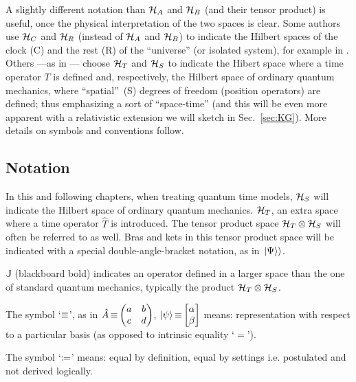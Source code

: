 A slightly different notation than $\mathcal{H}_A$ and $\mathcal{H}_B$ (and their tensor product)
is useful, once
the physical interpretation of the two spaces is clear.
Some authors use $\mathcal{H}_C$ and $\mathcal{H}_R$ (instead of $\mathcal{H}_A$ and $\mathcal{H}_B$)
to indicate the Hilbert spaces of the clock (C) and the rest (R) of the ``universe''
(or isolated system), for example in \cite{Marletto:Evolution}.
Others ---as in \cite{Lloyd:Time}--- 
choose $\mathcal{H}_T$ and $\mathcal{H}_S$ to indicate the Hibert space where
a time operator $T$ is defined and, respectively,
the Hilbert space of ordinary quantum mechanics,
where ``spatial''~(S)
degrees of freedom (position operators) are defined; thus emphasizing
a sort of ``space-time'' (and this will be even more apparent
with a relativistic extension we will sketch in Sec.~\ref{sec:KG}).
More details on symbols and conventions follow.

\subsection*{Notation}

In this and following chapters, when treating quantum time models,
$\mathcal{H}_S$ will indicate the Hilbert space of ordinary quantum mechanics.
$\mathcal{H}_T$, an extra space where a time operator $\hat{T}$ is introduced. The tensor
product space $\mathcal{H}_T \otimes \mathcal{H}_S$
will often be referred to as well.
Bras and kets in this tensor product space will be indicated with a special double-angle-bracket
notation, as in $\left.\left| \Psi \right\rangle\right\rangle$.

${\mathbb{J}}$ (blackboard bold) indicates an  operator defined in
a larger space than the one of standard quantum mechanics,
typically the product $\mathcal{H}_T \otimes \mathcal{H}_S$.

The symbol `$\operatorname*{\equiv}$', as in $\hat{A} \repr \mqty(a&b\\c&d)$, $\ket{\psi} \repr \mqty[\alpha \\ \beta]$
means: representation with respect to a particular basis (as opposed to intrinsic equality `$=$').

The symbol `$\coloneqq$'
means: equal by definition, equal by settings i.e. postulated and not derived logically.
